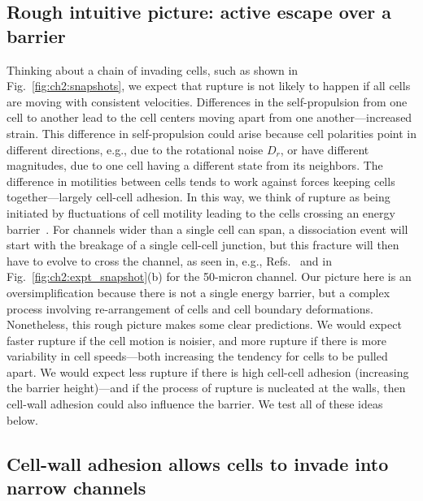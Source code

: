 \subsection{Rough intuitive picture: active escape over a barrier}

Thinking about a chain of invading cells, such as shown in Fig.~\ref{fig:ch2:snapshots}, we expect that rupture is not likely to happen if all cells are moving with consistent velocities.
Differences in the self-propulsion from one cell to another lead to the cell centers moving apart from one another---increased strain.
This difference in self-propulsion could arise because cell polarities point in different directions, e.g., due to the rotational noise $D_r$, or have different magnitudes, due to one cell having a different state from its neighbors.
The difference in motilities between cells tends to work against forces keeping cells together---largely cell-cell adhesion.
In this way, we think of rupture as being initiated by fluctuations of cell motility leading to the cells crossing an energy barrier~\cite{bi2014energy, woillez2020active}.
For channels wider than a single cell can span, a dissociation event will start with the breakage of a single cell-cell junction, but this fracture will then have to evolve to cross the channel, as seen in, e.g., Refs.~\cite{duque2024rupture, chen2022activation} and in Fig.~\ref{fig:ch2:expt_snapshot}(b) for the 50-micron channel.
Our picture here is an oversimplification because there is not a single energy barrier, but a complex process involving re-arrangement of cells and cell boundary deformations.
Nonetheless, this rough picture makes some clear predictions.
We would expect faster rupture if the cell motion is noisier, and more rupture if there is more variability in cell speeds---both increasing the tendency for cells to be pulled apart.
We would expect less rupture if there is high cell-cell adhesion (increasing the barrier height)---and if the process of rupture is nucleated at the walls, then cell-wall adhesion could also influence the barrier.
We test all of these ideas below.


\subsection{Cell-wall adhesion allows cells to invade into narrow channels}

